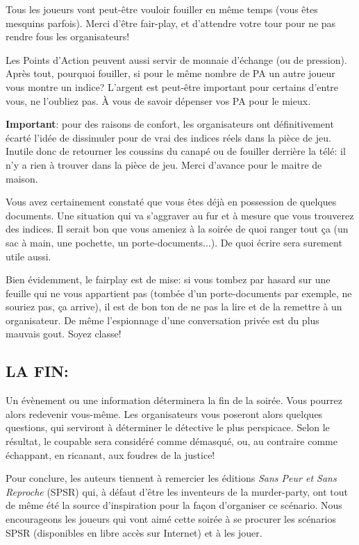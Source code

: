 \documentclass[14pt,twocolumn]{extarticle}
\begin{document}
Tous les joueurs vont peut-être vouloir \og fouiller\fg{} en même temps (vous
êtes mesquins parfois). Merci d'être fair-play, et d'attendre votre tour pour
ne pas rendre fous les organisateurs!

Les Points d'Action peuvent aussi servir de monnaie d'échange (ou de pression).
Après tout, pourquoi fouiller, si pour le même nombre de PA un autre joueur
vous montre un indice? \og L'argent\fg{} est peut-être important pour certains
d'entre vous, ne l'oubliez pas. À vous de savoir dépenser vos PA pour le mieux.

\textbf{Important}: pour des raisons de confort, les organisateurs ont
définitivement écarté l'idée de dissimuler pour de vrai des indices réels dans
la pièce de jeu. Inutile donc de retourner les coussins du canapé ou de
fouiller derrière la télé: il n'y a rien à trouver dans la pièce de jeu. Merci
d'avance pour le maitre de maison.

Vous avez certainement constaté que vous êtes déjà en possession de quelques
documents. Une situation qui va s'aggraver au fur et à mesure que vous
trouverez des indices. Il serait bon que vous ameniez à la soirée de quoi
ranger tout ça (un sac à main, une pochette, un porte-documents...). De quoi
écrire sera surement utile aussi.

Bien évidemment, le fairplay est de mise: si vous tombez par hasard sur une
feuille qui ne vous appartient pas (tombée d'un porte-documents par exemple, ne
souriez pas, ça arrive), il est de bon ton de ne pas la lire et de la remettre
à un organisateur. De même l'espionnage d'une conversation privée est du plus
mauvais gout. Soyez \og classe\fg{}!

\subsection{LA FIN:}

Un évènement ou une information déterminera la fin de la soirée. Vous pourrez
alors redevenir vous-même. Les organisateurs vous poseront alors quelques
questions, qui serviront à déterminer le détective le plus perspicace. Selon le
résultat, le coupable sera considéré comme démasqué, ou, au contraire comme
échappant, en ricanant, aux foudres de la justice!

Pour conclure, les auteurs tiennent à remercier les éditions \textit{Sans Peur
et Sans Reproche} (SPSR) qui, à défaut d'être les inventeurs de la
murder-party, ont tout de même été la source d'inspiration pour la façon
d'organiser ce scénario. Nous encourageons les joueurs qui vont aimé cette
soirée à se procurer les scénarios SPSR (disponibles en libre accès sur
Internet) et à les jouer.
\end{document}

